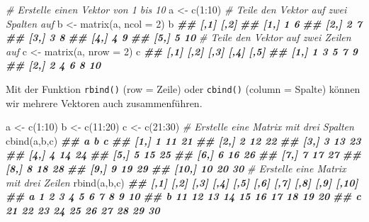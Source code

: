 \documentclass[
]{article}
\newenvironment{Shaded}{\begin{snugshade}}{\end{snugshade}}
\newcommand{\AttributeTok}[1]{\textcolor[rgb]{0.77,0.63,0.00}{#1}}
\newcommand{\CommentTok}[1]{\textcolor[rgb]{0.56,0.35,0.01}{\textit{#1}}}
\newcommand{\DecValTok}[1]{\textcolor[rgb]{0.00,0.00,0.81}{#1}}
\newcommand{\DocumentationTok}[1]{\textcolor[rgb]{0.56,0.35,0.01}{\textbf{\textit{#1}}}}
\newcommand{\FunctionTok}[1]{\textcolor[rgb]{0.00,0.00,0.00}{#1}}
\newcommand{\NormalTok}[1]{#1}
\newcommand{\OtherTok}[1]{\textcolor[rgb]{0.56,0.35,0.01}{#1}}
\newcommand{\SpecialCharTok}[1]{\textcolor[rgb]{0.00,0.00,0.00}{#1}}
\begin{document}
\begin{Shaded}
\begin{Highlighting}[]
\CommentTok{\# Erstelle einen Vektor von 1 bis 10}
\NormalTok{a }\OtherTok{\textless{}{-}} \FunctionTok{c}\NormalTok{(}\DecValTok{1}\SpecialCharTok{:}\DecValTok{10}\NormalTok{)}
\CommentTok{\# Teile den Vektor auf zwei Spalten auf}
\NormalTok{b }\OtherTok{\textless{}{-}} \FunctionTok{matrix}\NormalTok{(a, }\AttributeTok{ncol =} \DecValTok{2}\NormalTok{)}
\NormalTok{b}
\DocumentationTok{\#\#      [,1] [,2]}
\DocumentationTok{\#\# [1,]    1    6}
\DocumentationTok{\#\# [2,]    2    7}
\DocumentationTok{\#\# [3,]    3    8}
\DocumentationTok{\#\# [4,]    4    9}
\DocumentationTok{\#\# [5,]    5   10}
\CommentTok{\# Teile den Vektor auf zwei Zeilen auf}
\NormalTok{c }\OtherTok{\textless{}{-}} \FunctionTok{matrix}\NormalTok{(a, }\AttributeTok{nrow =} \DecValTok{2}\NormalTok{)}
\NormalTok{c}
\DocumentationTok{\#\#      [,1] [,2] [,3] [,4] [,5]}
\DocumentationTok{\#\# [1,]    1    3    5    7    9}
\DocumentationTok{\#\# [2,]    2    4    6    8   10}
\end{Highlighting}
\end{Shaded}

Mit der Funktion \texttt{rbind()} (row = Zeile) oder \texttt{cbind()} (column = Spalte) können wir mehrere Vektoren auch zusammenführen.

\begin{Shaded}
\begin{Highlighting}[]
\NormalTok{a }\OtherTok{\textless{}{-}} \FunctionTok{c}\NormalTok{(}\DecValTok{1}\SpecialCharTok{:}\DecValTok{10}\NormalTok{)}
\NormalTok{b }\OtherTok{\textless{}{-}} \FunctionTok{c}\NormalTok{(}\DecValTok{11}\SpecialCharTok{:}\DecValTok{20}\NormalTok{)}
\NormalTok{c }\OtherTok{\textless{}{-}} \FunctionTok{c}\NormalTok{(}\DecValTok{21}\SpecialCharTok{:}\DecValTok{30}\NormalTok{)}
\CommentTok{\# Erstelle eine Matrix mit drei Spalten}
\FunctionTok{cbind}\NormalTok{(a,b,c)}
\DocumentationTok{\#\#        a  b  c}
\DocumentationTok{\#\#  [1,]  1 11 21}
\DocumentationTok{\#\#  [2,]  2 12 22}
\DocumentationTok{\#\#  [3,]  3 13 23}
\DocumentationTok{\#\#  [4,]  4 14 24}
\DocumentationTok{\#\#  [5,]  5 15 25}
\DocumentationTok{\#\#  [6,]  6 16 26}
\DocumentationTok{\#\#  [7,]  7 17 27}
\DocumentationTok{\#\#  [8,]  8 18 28}
\DocumentationTok{\#\#  [9,]  9 19 29}
\DocumentationTok{\#\# [10,] 10 20 30}
\CommentTok{\# Erstelle eine Matrix mit drei Zeilen}
\FunctionTok{rbind}\NormalTok{(a,b,c)}
\DocumentationTok{\#\#   [,1] [,2] [,3] [,4] [,5] [,6] [,7] [,8] [,9] [,10]}
\DocumentationTok{\#\# a    1    2    3    4    5    6    7    8    9    10}
\DocumentationTok{\#\# b   11   12   13   14   15   16   17   18   19    20}
\DocumentationTok{\#\# c   21   22   23   24   25   26   27   28   29    30}
\end{Highlighting}
\end{Shaded}
\end{document}

